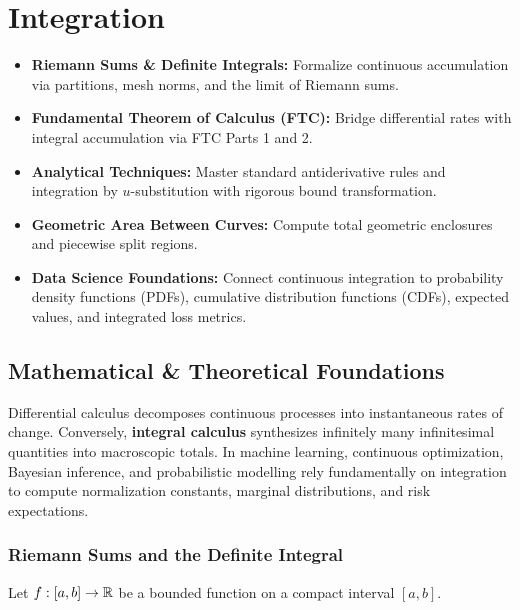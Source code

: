 \chapter{Integration}

\begin{tcolorbox}[colback=primarylight, colframe=primarydark, title={\textbf{Executive Roadmap \& Learning Objectives}}]
\begin{itemize}
    \item \textbf{Riemann Sums \& Definite Integrals:} Formalize continuous accumulation via partitions, mesh norms, and the limit of Riemann sums.
    \item \textbf{Fundamental Theorem of Calculus (FTC):} Bridge differential rates with integral accumulation via FTC Parts 1 and 2.
    \item \textbf{Analytical Techniques:} Master standard antiderivative rules and integration by $u$-substitution with rigorous bound transformation.
    \item \textbf{Geometric Area Between Curves:} Compute total geometric enclosures and piecewise split regions.
    \item \textbf{Data Science Foundations:} Connect continuous integration to probability density functions (PDFs), cumulative distribution functions (CDFs), expected values, and integrated loss metrics.
\end{itemize}
\end{tcolorbox}

\section{Mathematical \& Theoretical Foundations}

Differential calculus decomposes continuous processes into instantaneous rates of change. Conversely, \textbf{integral calculus} synthesizes infinitely many infinitesimal quantities into macroscopic totals. In machine learning, continuous optimization, Bayesian inference, and probabilistic modelling rely fundamentally on integration to compute normalization constants, marginal distributions, and risk expectations.

\subsection{Riemann Sums and the Definite Integral}

Let $f: [a, b] \to \mathbb{R}$ be a bounded function on a compact interval $[a, b]$. 

